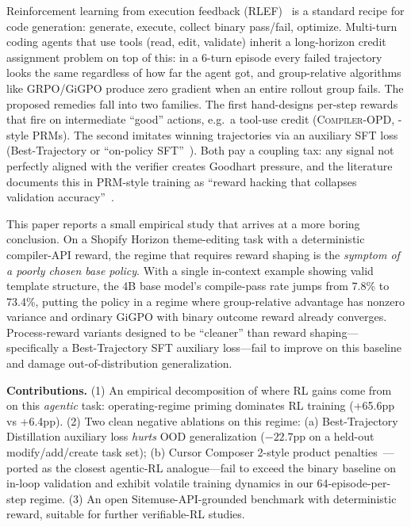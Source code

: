 \documentclass[10pt]{article}
\begin{document}
Reinforcement learning from execution feedback (RLEF)~\cite{le2022coderl,shao2024grpo}
is a standard recipe for code generation: generate, execute, collect binary
pass/fail, optimize. Multi-turn coding agents that use tools (read, edit,
validate) inherit a long-horizon credit assignment problem on top of this:
in a 6-turn episode every failed trajectory looks the same regardless of how
far the agent got, and group-relative algorithms like GRPO/GiGPO produce zero
gradient when an entire rollout group fails. The proposed remedies fall into
two families. The first hand-designs per-step rewards that fire on
intermediate ``good'' actions, e.g.\ a tool-use credit
(\textsc{Compiler-OPD}, \cite{wang2024mathshepherd}-style PRMs). The second
imitates winning trajectories via an auxiliary SFT loss (Best-Trajectory or
``on-policy SFT''~\cite{lambert2025tulu3}). Both pay a coupling tax: any signal
not perfectly aligned with the verifier creates Goodhart pressure, and the
literature documents this in PRM-style training as ``reward hacking that
collapses validation accuracy''~\cite{lambert2025tulu3}.

This paper reports a small empirical study that arrives at a more boring
conclusion. On a Shopify Horizon theme-editing task with a deterministic
compiler-API reward, the regime that requires reward shaping is the
\emph{symptom of a poorly chosen base policy}. With a single in-context
example showing valid template structure, the 4B base model's compile-pass
rate jumps from 7.8\% to 73.4\%, putting the policy in a regime where
group-relative advantage has nonzero variance and ordinary GiGPO with
binary outcome reward already converges. Process-reward variants designed
to be ``cleaner'' than reward shaping---specifically a Best-Trajectory SFT
auxiliary loss---fail to improve on this baseline and damage out-of-distribution
generalization.

\textbf{Contributions.}
(1) An empirical decomposition of where RL gains come from on this
\emph{agentic} task: operating-regime priming dominates RL training
(+65.6pp vs +6.4pp).
(2) Two clean negative ablations on this regime:
(a) Best-Trajectory Distillation auxiliary loss \emph{hurts} OOD
generalization (\(-22.7\)pp on a held-out modify/add/create task set);
(b) Cursor Composer 2-style product
penalties~\cite{cursor2025composer2}---ported as the closest agentic-RL
analogue---fail to exceed the binary baseline on in-loop validation
and exhibit volatile training dynamics in our 64-episode-per-step
regime.
(3) An open Sitemuse-API-grounded benchmark with deterministic reward,
suitable for further verifiable-RL studies.
\end{document}
